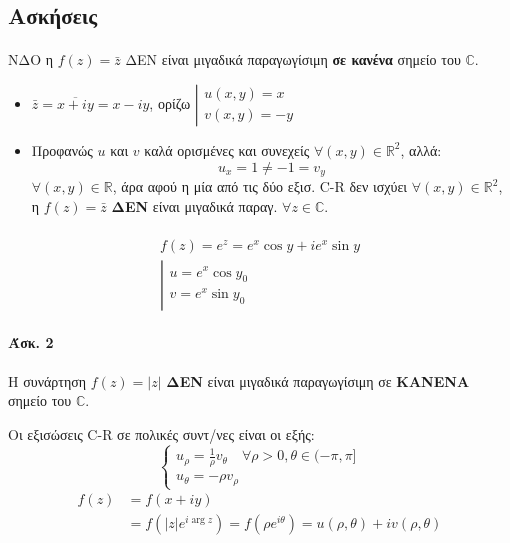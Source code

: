 \documentclass[12pt,a4paper,titlepage,fleqn]{article}
\begin{document}
	 \subsection{Ασκήσεις}
	 \paragraph{} ΝΔΟ
	 η \( f(z)=\bar z \) ΔΕΝ είναι μιγαδικά παραγωγίσιμη \textbf{σε κανένα}
	 σημείο του \( \mathbb C \).
	 
	 \begin{itemize}
	 	\item \( \bar z = \overline{x+iy}=x-iy \), ορίζω
	 	\( \left| \begin{array}{l}
	 	u(x,y) = x \\ v(x,y) = -y
	 	\end{array} \right. \)
	 	\item Προφανώς \( u \) και \( v \) καλά ορισμένες και συνεχείς
	 	\( \forall (x,y)\in\mathbb R^2 \), αλλά:
	 	\[
	 	u_x=1\neq -1 = v_y
	 	\]
	 	\( \forall(x,y)\in \mathbb R \), άρα αφού η μία από τις δύο εξισ.
	 	C-R δεν ισχύει \underline{\( \forall(x,y)\in\mathbb R^2 \)},
	 	η \( f(z)=\bar z \) \textbf{ΔΕΝ} είναι μιγαδικά παραγ.
	 	\( \forall z\in\mathbb C \).
	 \end{itemize}
	 
	 
	 \paragraph{}
	 \begin{gather*}
	 f(z)=e^z=e^x\cos y+ie^x\sin y \\
	 \left|
	 \begin{array}{l}
	 u = e^x\cos y_0 \\ v=e^x\sin y_0
	 \end{array}
	 \right.
	 \end{gather*}
	 
	 
	 \paragraph{Άσκ. 2}
	 Η συνάρτηση \( f(z)=|z| \) \textbf{ΔΕΝ} είναι μιγαδικά παραγωγίσιμη σε
	 \textbf{ΚΑΝΕΝΑ} σημείο του \( \mathbb C  \).
	 
	 \begin{infobox}{}
	 	Οι εξισώσεις C-R σε πολικές συντ/νες είναι οι εξής:
	 	\[
	 	\begin{cases}
	 	u_\rho = \frac{1}{\rho}v_\theta \quad \forall \rho>0,
	 	         \theta\in(-\pi,\pi]\\
	 	u_\theta=-\rho v_\rho
	 	\end{cases}
	 	\]
	 	\tcblower
	 	\begin{align*}
	 	f(z) &= f(x+iy) \\
	 	     &= f\left( |z|e^{i\arg z} \right) = f\left(\rho e^{i\theta}\right)
	 	     = u(\rho,\theta)+iv(\rho,\theta)
	 	\end{align*}
	 \end{infobox}
	 
\end{document}
